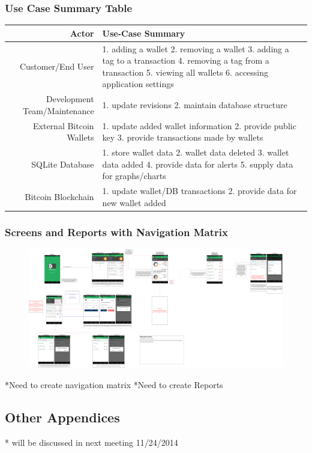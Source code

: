     \subsubsection{Use Case Summary Table}
	\begin{table}[H]
      \begin{tabularx}{\textwidth}{r | X}
        Actor                       & Use-Case Summary\\
        \hline
        Customer/End User            & 1. adding a wallet
									   2. removing a wallet
									   3. adding a tag to a transaction
									   4. removing a tag from a transaction
									   5. viewing all wallets
									   6. accessing application settings\\
        Development Team/Maintenance & 1. update revisions
									   2. maintain database structure\\
        External Bitcoin Wallets     & 1. update added wallet information
									   2. provide public key 
									   3. provide transactions made by wallets\\
        SQLite Database              & 1. store wallet data
									   2. wallet data deleted
									   3. wallet data added
									   4. provide data for alerts
									   5. supply data for graphs/charts\\
        Bitcoin Blockchain           & 1. update wallet/DB transactions
									   2. provide data for new wallet added\\
      \end{tabularx}
    \end{table}

    \subsubsection{Screens and Reports with Navigation Matrix}
	
	\begin{figure}[H]
     \includegraphics[width=1.0\textwidth]{../diagrams/storyboard.png}
      \end{figure}
	*Need to create navigation matrix
	*Need to create Reports
	
  \subsection{Other Appendices}
  * will be discussed in next meeting 11/24/2014
